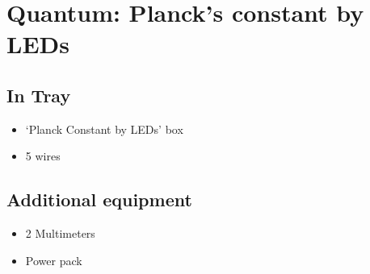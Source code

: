 \section{Quantum: Planck's constant by LEDs}


\subsection{In Tray}

\begin{itemize}
\item `Planck Constant by LEDs' box
\item 5 wires
\end{itemize}


\subsection{Additional equipment}

\begin{itemize}
\item 2 Multimeters
\item Power pack
\end{itemize}
